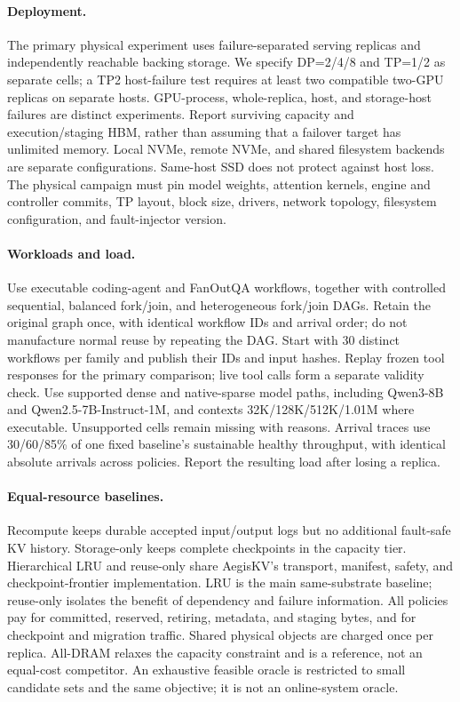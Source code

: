 \documentclass[sigplan,10pt,anonymous,nonacm]{acmart}
\begin{document}
\paragraph{Deployment.}
The primary physical experiment uses failure-separated serving replicas
and independently reachable backing storage. We specify DP=2/4/8 and TP=1/2
as separate cells; a TP2 host-failure test requires at least two compatible
two-GPU replicas on separate hosts. GPU-process, whole-replica, host, and
storage-host failures are distinct experiments. Report surviving capacity
and execution/staging HBM, rather than assuming that a failover target has
unlimited memory. Local NVMe, remote NVMe, and shared filesystem backends
are separate configurations. Same-host SSD does not protect against host
loss. The physical campaign must pin model weights, attention kernels,
engine and controller commits, TP layout, block size, drivers, network
topology, filesystem configuration, and fault-injector version.

\paragraph{Workloads and load.}
Use executable coding-agent and FanOutQA workflows, together with controlled
sequential, balanced fork/join, and heterogeneous fork/join DAGs. Retain
the original graph once, with identical workflow IDs and arrival order;
do not manufacture normal reuse by repeating the DAG. Start with 30
distinct workflows per family and publish their IDs and input hashes.
Replay frozen tool responses for the primary comparison; live tool calls
form a separate validity check. Use supported dense and native-sparse
model paths, including Qwen3-8B and Qwen2.5-7B-Instruct-1M, and contexts
32K/128K/512K/1.01M where executable. Unsupported cells remain missing
with reasons. Arrival traces use 30/60/85\% of one fixed baseline's
sustainable healthy throughput, with identical absolute arrivals across
policies. Report the resulting load after losing a replica.

\paragraph{Equal-resource baselines.}
Recompute keeps durable accepted input/output logs but no additional
fault-safe KV history. Storage-only keeps complete checkpoints in the
capacity tier. Hierarchical LRU and reuse-only share AegisKV's transport,
manifest, safety, and checkpoint-frontier implementation. LRU is the main
same-substrate baseline; reuse-only isolates the benefit of dependency and
failure information. All policies pay for committed, reserved, retiring,
metadata, and staging bytes, and for checkpoint and migration traffic.
Shared physical objects are charged once per replica. All-DRAM relaxes
the capacity constraint and is a reference, not an equal-cost competitor.
An exhaustive feasible oracle is restricted to small candidate sets and
the same objective; it is not an online-system oracle.
\end{document}
